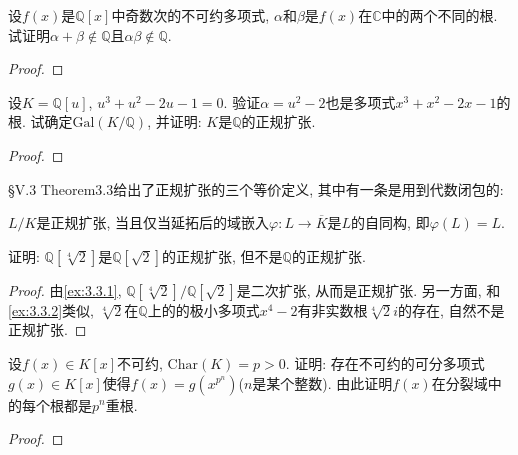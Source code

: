 \begin{problem}
    设$f(x)$是$\mathbb{Q}[x]$中奇数次的不可约多项式, $\alpha$和$\beta$是$f(x)$在$\mathbb{C}$中的两个不同的根. 试证明$\alpha + \beta \notin \mathbb{Q}$且$\alpha\beta \notin \mathbb{Q}$.
\end{problem}

\begin{proof}
    
\end{proof}

\begin{problem}
    设$K = \mathbb{Q}[u]$, $u^3 + u^2 - 2u - 1 = 0$. 验证$\alpha = u^2 - 2$也是多项式$x^3 + x^2 - 2x - 1$的根. 试确定$\mathrm{Gal}(K/\mathbb{Q})$, 并证明: $K$是$\mathbb{Q}$的正规扩张.
\end{problem}

\begin{proof}
    
\end{proof}

\begin{remark}
    \cite{lang2012algebra}\S V.3 Theorem3.3给出了正规扩张的三个等价定义, 其中有一条是用到代数闭包的:

    $L/K$是正规扩张, 当且仅当延拓后的域嵌入$\varphi:L \to \overline{K}$是$L$的自同构, 即$\varphi(L) = L$.
\end{remark}

\begin{problem}
    证明: $\mathbb{Q}[\sqrt[4]{2}]$是$\mathbb{Q}[\sqrt{2}]$的正规扩张, 但不是$\mathbb{Q}$的正规扩张.
\end{problem}

\begin{proof}
    由\ref{ex:3.3.1}, $\mathbb{Q}[\sqrt[4]{2}]/\mathbb{Q}[\sqrt{2}]$是二次扩张, 从而是正规扩张. 另一方面, 和\ref{ex:3.3.2}类似, $\sqrt[4]{2}$在$\mathbb{Q}$上的的极小多项式$x^4 - 2$有非实数根$\sqrt[4]{2}i$的存在, 自然不是正规扩张.
\end{proof}

\begin{problem}
    设$f(x) \in K[x]$不可约, $\mathrm{Char}(K) = p > 0$. 证明: 存在不可约的可分多项式$g(x) \in K[x]$使得$f(x) = g(x^{p^n})$($n$是某个整数). 由此证明$f(x)$在分裂域中的每个根都是$p^n$重根.
\end{problem}

\begin{proof}
    
\end{proof}

